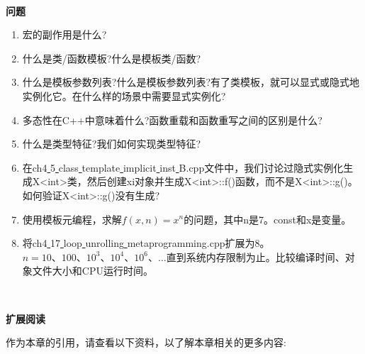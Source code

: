 \noindent\textbf{}\ \par
\textbf{问题} \ \par
\begin{enumerate}
	\item 宏的副作用是什么?
	\item 什么是类/函数模板?什么是模板类/函数?
	\item 什么是模板参数列表?什么是模板参数列表?有了类模板，就可以显式或隐式地实例化它。在什么样的场景中需要显式实例化?
	\item 多态性在C++中意味着什么?函数重载和函数重写之间的区别是什么?
	\item 什么是类型特征?我们如何实现类型特征?
	\item 在ch4\underline{ }5\underline{ }class\underline{ }template\underline{ }implicit\underline{ }inst\underline{ }B.cpp文件中，我们讨论过隐式实例化生成X<int>类，然后创建xi对象并生成X<int>::f()函数，而不是X<int>::g()。如何验证X<int>::g()没有生成?
	\item 使用模板元编程，求解$f(x,n) = x^n$的问题，其中n是7。const和x是变量。
	\item 将ch4\underline{ }17\underline{ }loop\underline{ }unrolling\underline{ }metaprogramming.cpp扩展为8。$n = 10、100、10^3、10^4、10 ^ 6、…$直到系统内存限制为止。比较编译时间、对象文件大小和CPU运行时间。
\end{enumerate}

\noindent\textbf{}\ \par
\textbf{扩展阅读} \ \par
作为本章的引用，请查看以下资料，以了解本章相关的更多内容: \par

